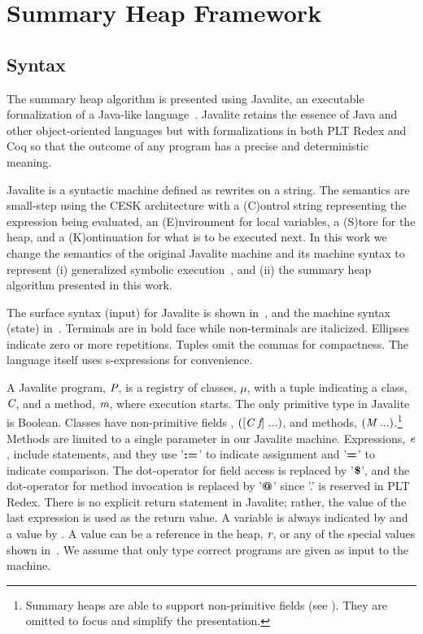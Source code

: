 \section{Summary Heap Framework}
\subsection{Syntax}
The summary heap algorithm is presented using Javalite, an
executable formalization of a Java-like language~\cite{saints-MS}. Javalite retains 
the essence of Java and other object-oriented languages but with formalizations 
in both PLT Redex and Coq so that the outcome of any program has a precise
and deterministic meaning.

Javalite is a syntactic machine defined as rewrites on a string.  The
semantics are small-step using the CESK architecture with a (C)ontrol string
representing the expression being evaluated, an (E)nvironment for
local variables, a (S)tore for the heap, and a (K)ontinuation for what
is to be executed next.  In this work we change the semantics of the original
 Javalite machine and its machine syntax to represent (i) generalized
symbolic execution~\cite{GSE03}, and (ii) the summary heap algorithm
presented in this work.

The surface syntax (input) for Javalite is shown 
in~, and the machine syntax (state)
in~. Terminals are in bold face while
non-terminals are italicized. Ellipses indicate zero or more
repetitions. Tuples omit the commas for compactness. The language
itself uses s-expressions for convenience.




A Javalite program, $\emph{P}$, is a registry of classes, $\mu$, with
a tuple indicating a class, $\emph{C}$, and a method, $\emph{m}$,
where execution starts. The only primitive type in Javalite is
Boolean. Classes have non-primitive fields , $([\emph{C}\ \emph{f}]\ ...)$, and
methods, $(\emph{M}\ ...)$.\footnote{Summary heaps are able to support non-primitive fields (see ). They are omitted to focus and simplify the presentation.} Methods are limited to a single
parameter in our Javalite machine. Expressions, $\emph{e}$,  
include statements, and they
 use '$\textbf{:=}$' to indicate assignment and '$\textbf{=}$' to indicate comparison.
The dot-operator for field access is replaced by '$\textbf{\$}$', and the dot-operator
for method invocation is replaced by '$\textbf{@}$' since '.' is reserved in PLT Redex. There is no explicit return
statement in Javalite; rather, the value of the last expression is
used as the return value. A variable is always indicated by 
and a value by . A value can be a reference in the heap, $\emph{r}$, or any of the special values shown in~. 
We assume that only
type correct programs are given as input to the machine.

